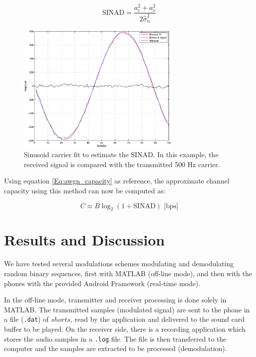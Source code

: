 \documentclass[12pt,a4paper,openright]{report}
\begin{document}
\begin{equation}\label{Eq:sinad} \text{SINAD} = \frac{a_c^2+a_s^2}{2\hat\sigma_n^2}\end{equation}

\begin{figure}[H]
  \centering
    \includegraphics[width=0.7\textwidth]{sinusoid_fit.eps}
    \caption[Sinusoid carrier fit to estimate the SINAD.]{Sinusoid carrier fit to estimate the SINAD. In this example, the received signal is compared with the transmitted 500 Hz carrier.}
    \label{fig:sinusoid_fit}
\end{figure}

Using equation \ref{Eq:awgn_capacity} as reference, the approximate channel capacity using this method can now be computed as: 

\begin{equation}
\label{Eq:sinad_chan_cap} C \approx B\log_2(1+\text{SINAD})\text{                [bps]}
\end{equation}




\chapter{Results and Discussion} \label{chap:results}
We have tested several modulations schemes modulating and demodulating random binary sequences, first with MATLAB (off-line mode), and then with the phones with the provided Android Framework (real-time mode). 

In the off-line mode, transmitter and receiver processing is done solely in MATLAB. The transmitted samples (modulated signal) are sent to the phone in a file (\texttt{.dat}) of $shorts$, read by the application and delivered to the sound card buffer to be played. On the receiver side, there is a recording application which stores the audio samples in a \texttt{.log} file. The file is then transferred to the computer and the samples are extracted to be processed (demodulation).  
\end{document}
